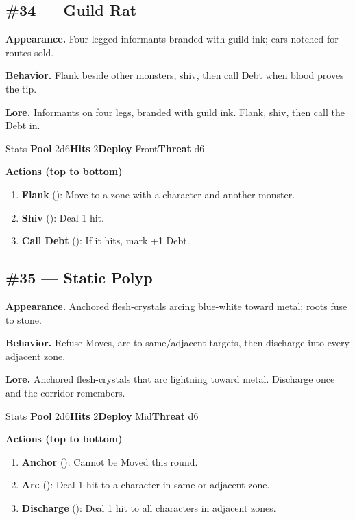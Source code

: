 \subsection*{\#34 --- Guild Rat}

\textbf{Appearance.} Four-legged informants branded with guild ink; ears notched for routes sold.

\textbf{Behavior.} Flank beside other monsters, shiv, then call Debt when blood proves the tip.

\textbf{Lore.} Informants on four legs, branded with guild ink. Flank, shiv, then call the Debt in.

\begin{monsterentry}{Stats}
\textbf{Pool} 2d6\quad\textbf{Hits} 2\quad\textbf{Deploy} Front\quad\textbf{Threat} d6

\textbf{Actions (top to bottom)}
\begin{enumerate}\setlength{\itemsep}{0.15em}\setlength{\parskip}{0pt}
  \item \textbf{Flank} (\easy): Move to a zone with a character and another monster.
  \item \textbf{Shiv} (\medium): Deal 1 hit.
  \item \textbf{Call Debt} (\hard): If it hits, mark +1 Debt.
\end{enumerate}
\end{monsterentry}

\subsection*{\#35 --- Static Polyp}

\textbf{Appearance.} Anchored flesh-crystals arcing blue-white toward metal; roots fuse to stone.

\textbf{Behavior.} Refuse Moves, arc to same/adjacent targets, then discharge into every adjacent zone.

\textbf{Lore.} Anchored flesh-crystals that arc lightning toward metal. Discharge once and the corridor remembers.

\begin{monsterentry}{Stats}
\textbf{Pool} 2d6\quad\textbf{Hits} 2\quad\textbf{Deploy} Mid\quad\textbf{Threat} d6

\textbf{Actions (top to bottom)}
\begin{enumerate}\setlength{\itemsep}{0.15em}\setlength{\parskip}{0pt}
  \item \textbf{Anchor} (\easy): Cannot be Moved this round.
  \item \textbf{Arc} (\medium): Deal 1 hit to a character in same or adjacent zone.
  \item \textbf{Discharge} (\hard): Deal 1 hit to all characters in adjacent zones.
\end{enumerate}
\end{monsterentry}

